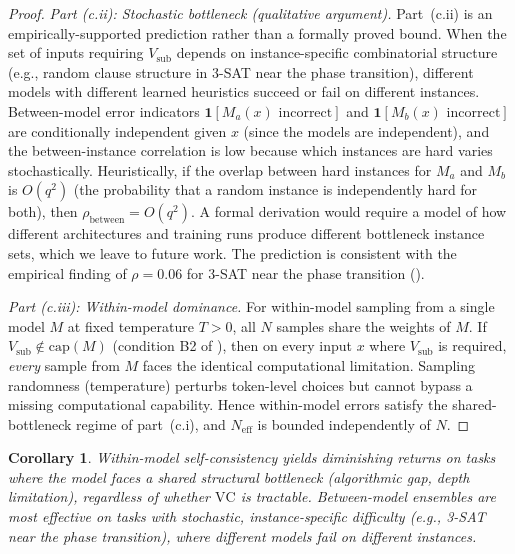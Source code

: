 \documentclass{article}
\newtheorem{corollary}[theorem]{Corollary}
\theoremstyle{definition}
\theoremstyle{remark}
\newcommand{\VC}{\mathrm{VC}}           %
\begin{document}
\begin{proof}
\emph{Part (c.ii): Stochastic bottleneck (qualitative argument).}
Part~(c.ii) is an empirically-supported prediction rather than a formally proved bound.
When the set of inputs requiring $V_{\mathrm{sub}}$ depends on instance-specific combinatorial structure (e.g., random clause structure in 3-SAT near the phase transition), different models with different learned heuristics succeed or fail on different instances.
Between-model error indicators $\mathbf{1}[M_a(x) \text{ incorrect}]$ and $\mathbf{1}[M_b(x) \text{ incorrect}]$ are conditionally independent given $x$ (since the models are independent), and the between-instance correlation is low because which instances are hard varies stochastically.
Heuristically, if the overlap between hard instances for $M_a$ and $M_b$ is $O(q^2)$ (the probability that a random instance is independently hard for both), then $\rho_{\mathrm{between}} = O(q^2)$.
A formal derivation would require a model of how different architectures and training runs produce different bottleneck instance sets, which we leave to future work.
The prediction is consistent with the empirical finding of $\rho = 0.06$ for 3-SAT near the phase transition ().

\emph{Part (c.iii): Within-model dominance.}
For within-model sampling from a single model $M$ at fixed temperature $T > 0$, all $N$ samples share the weights of $M$.
If $V_{\mathrm{sub}} \notin \mathrm{cap}(M)$ (condition B2 of ), then on every input $x$ where $V_{\mathrm{sub}}$ is required, \emph{every} sample from $M$ faces the identical computational limitation.
Sampling randomness (temperature) perturbs token-level choices but cannot bypass a missing computational capability.
Hence within-model errors satisfy the shared-bottleneck regime of part~(c.i), and $N_{\mathrm{eff}}$ is bounded independently of $N$.
\end{proof}

\begin{corollary}
\label{cor:selfconsistency_prediction}
Within-model self-consistency yields diminishing returns on tasks where the model faces a shared structural bottleneck (algorithmic gap, depth limitation), regardless of whether $\VC$ is tractable.
Between-model ensembles are most effective on tasks with stochastic, instance-specific difficulty (e.g., 3-SAT near the phase transition), where different models fail on different instances.
\end{corollary}
\end{document}
